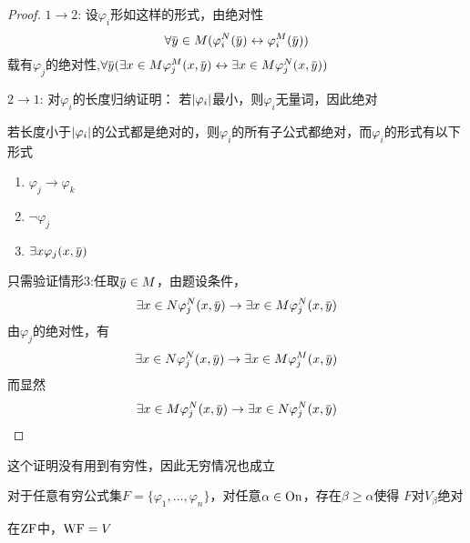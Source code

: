 \documentclass[11pt]{article}
\begin{document}
\begin{proof}
\(1\to 2\): 设\(\varphi_i\)形如这样的形式，由绝对性
\begin{equation*}
\forall\bary\in M(\varphi_i^N(\bary)\leftrightarrow\varphi_i^M(\bary))
\end{equation*}
载有\(\varphi_j\)的绝对性,\(\forall\bary(\exists x\in M\varphi_j^M(x,\bary)\leftrightarrow\exists x\in M\varphi_j^N(x,\bary))\)

\(2\to 1\): 对\(\varphi_i\)的长度归纳证明：
若\(\abs{\varphi_i}\)最小，则\(\varphi_i\)无量词，因此绝对

若长度小于\(\abs{\varphi_i}\)的公式都是绝对的，则\(\varphi_i\)的所有子公式都绝对，而\(\varphi_i\)的形式有以下形式
\begin{enumerate}
\item \(\varphi_j\to\varphi_k\)
\item \(\neg\varphi_j\)
\item \(\exists x\varphi_j(x,\bary)\)
\end{enumerate}


只需验证情形3:任取\(\bary\in M\)，由题设条件，
\begin{equation*}
\exists x\in N\varphi_j^N(x,\bary)\to\exists x\in M\varphi_j^N(x,\bary)
\end{equation*}
由\(\varphi_j\)的绝对性，有
\begin{equation*}
\exists x\in N\varphi_j^N(x,\bary)\to\exists x\in M\varphi_j^M(x,\bary)
\end{equation*}
而显然
\begin{equation*}
\exists x\in M\varphi_j^N(x,\bary)\to\exists x\in N\varphi_j^N(x,\bary)
\end{equation*}
\end{proof}

这个证明没有用到有穷性，因此无穷情况也成立

\begin{theorem}[反映定理，ZF]
对于任意有穷公式集\(F=\{\varphi_1,\dots,\varphi_n\}\)，对任意\(\alpha\in\operatorname{On}\)，存在\(\beta\ge\alpha\)使得
\(F\)对\(V_\beta\)绝对
\end{theorem}

在\(\operatorname{ZF}\)中，\(\operatorname{WF}=V\)
\end{document}
